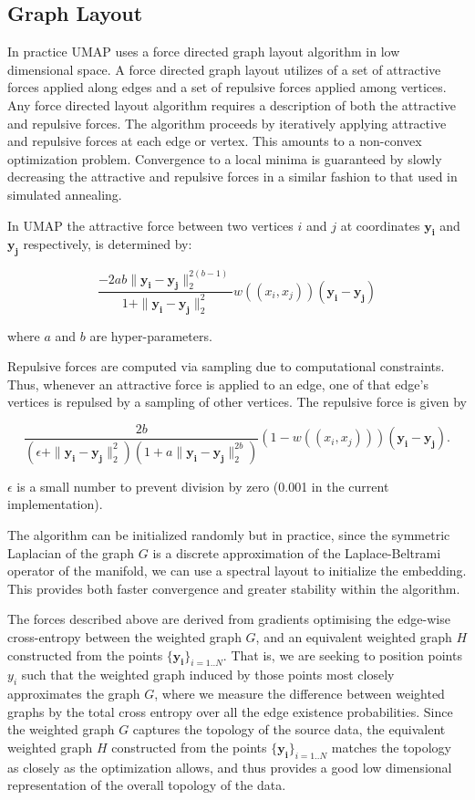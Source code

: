 \documentclass[12pt]{article}
\begin{document}
\subsection{Graph Layout}

In practice UMAP uses a force directed graph layout algorithm in low dimensional space.  A force directed graph layout utilizes of a set of attractive forces applied along edges and a set of repulsive forces applied among vertices.  Any force directed layout algorithm requires a description of both the attractive and repulsive forces.  The algorithm proceeds by iteratively applying attractive and repulsive forces at each edge or vertex.  This amounts to a non-convex optimization problem. Convergence to a local minima is guaranteed by slowly decreasing the attractive and repulsive forces in a similar fashion to that used in simulated annealing.  

In UMAP the attractive force between two vertices $i$ and
$j$ at coordinates $\mathbf{y_i}$ and $\mathbf{y_j}$ respectively, is determined by:

\[
\frac{-2ab \|\mathbf{y_i} - \mathbf{y_j} \|_2^
{2\left(b - 1\right)}}{1 + \|\mathbf{y_i} - \mathbf{y_j} \|_2^2}  w((x_i, x_j)) \left(\mathbf{y_i - y_j}\right)
\]\label{Attractive equation}

where $a$ and $b$ are hyper-parameters.

Repulsive forces are computed via sampling due to computational constraints.  Thus, whenever an attractive force is applied to an edge, one of that edge's vertices is repulsed by a sampling of other vertices.  The repulsive force is given by

\[
\frac{2b}{\left(\epsilon + \|\mathbf{y_i} - \mathbf{y_j} \|_2^2\right)
\left(1 + a\|\mathbf{y_i} - \mathbf{y_j} \|_2^{2b}\right)}
\left(1 - w((x_i, x_j))\right)\left(\mathbf{y_i - y_j}\right).
\]\label{Repulsive equation}

$\epsilon$ is a small number to prevent division by zero (0.001 in the current implementation).

The algorithm can be initialized randomly but in practice, since the symmetric Laplacian of the graph $G$ is a discrete approximation of the Laplace-Beltrami operator of the manifold, we can use a spectral layout to initialize the embedding.  This provides both faster convergence and greater stability within the algorithm.

The forces described above are derived from gradients optimising the edge-wise cross-entropy between the weighted graph $G$, and an equivalent weighted graph $H$ constructed from the points $\{\mathbf{y_i}\}_{i=1..N}$. That is, we are seeking to position points $y_i$ such that the weighted graph induced by those points most closely approximates the graph $G$, where we measure the difference between weighted graphs by the total cross entropy over all the edge existence probabilities. Since the weighted graph $G$ captures the topology of the source data, the equivalent weighted graph $H$ constructed from the points $\{\mathbf{y_i}\}_{i=1..N}$ matches the topology as closely as the optimization allows, and thus provides a good low dimensional representation of the overall topology of the data.
\end{document}
